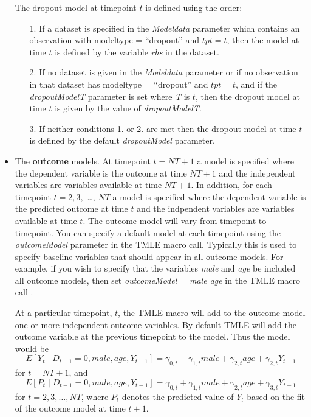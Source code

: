 \documentclass[10pt]{article}
\begin{document}
\begin{itemize}
The dropout model at timepoint $t$ is defined using the order:
\begin{itemize}
 \item[{1.}] If a dataset is specified in the {\em Modeldata} parameter which contains an observation with modeltype = ``dropout'' and $tpt = t$, then the model at time $t$ is defined by the variable {\em rhs} in the dataset.
 \item[{2.}] If no dataset is given in the {\em Modeldata} parameter or if no observation in that dataset has modeltype = ``dropout'' and $tpt = t$, and if the {\em dropoutModelT} parameter is set where {\em T} is $t$, then the dropout model at time $t$ is given by the value of {\em dropoutModelT}.
 \item[{3.}] If neither conditions {1.} or {2.} are met then the dropout model at time $t$ is defined by the default {\em dropoutModel} parameter.
\end{itemize}

\item The {\bf outcome} models.
      At timepoint $t = NT+1$ a model is specified where the dependent variable is the outcome at time $NT+1$ and the independent variables are variables available at time $NT+1$.  In addition, for each timepoint $t=2, 3,$ \ldots, $NT$ a model is specified where the dependent variable is the predicted outcome at time $t$ and the indpendent variables are variables available at time $t$.  The outcome model will vary from timepoint to timepoint.  You can specify a default model at each timepoint using the {\em outcomeModel} parameter in the TMLE macro call.  Typically this is used to specify baseline variables that should appear in all outcome models.   For example, if you wish to specify that the variables {\em male} and {\em age} be included all outcome models, then set {\em outcomeModel = male age} in the TMLE macro call . 

At a particular timepoint, $t$, the TMLE macro will add to the outcome model one or more independent outcome variables.  By default TMLE will add the outcome variable at the previous timepoint to the model.   Thus the model would be
$$ E[ Y_{t} \mid D_{t-1} = 0, male, age, Y_{t-1} ] = \gamma_{0,t} + \gamma_{1,t} male + \gamma_{2,t} age + \gamma_{2,t} Y_{t-1} $$ for $t = NT+1$, and   
$$ E[ P_{t} \mid D_{t-1} = 0, male, age, Y_{t-1} ] = \gamma_{0,t} + \gamma_{1,t} male + \gamma_{2,t} age + \gamma_{3,t} Y_{t-1} $$
for $t = 2,3, \ldots, NT$, where $P_{t}$ denotes the predicted value of $Y_t$ based on the fit of the outcome model at time $t+1$.


\end{itemize}
\end{document}
